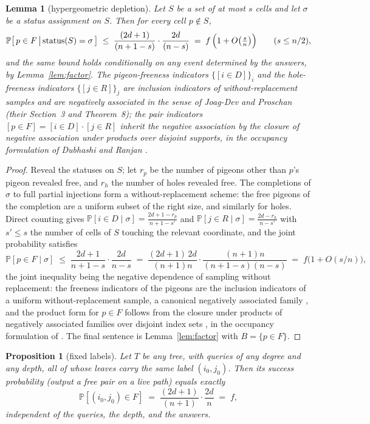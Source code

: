 \documentclass[11pt]{article}
\newtheorem{proposition}[theorem]{Proposition}
\newtheorem{lemma}[theorem]{Lemma}
\theoremstyle{definition}
\theoremstyle{remark}
\newcommand{\Prob}{\mathbb{P}}
\begin{document}
\begin{lemma}[hypergeometric depletion]\label{lem:depletion}
Let $S$ be a set of at most $s$ cells and let $\sigma$ be a status
assignment on $S$.  Then for every cell $p\notin S$,
\[
\Prob\bigl[\,p\in F \,\big|\, \mathrm{status}(S)=\sigma\,\bigr]
\;\le\;\frac{(2d+1)}{(n+1-s)}\cdot\frac{2d}{(n-s)}
\;=\;f\,\Bigl(1+O\bigl(\tfrac{s}{n}\bigr)\Bigr)
\qquad (s\le n/2),
\]
and the same bound holds conditionally on any event determined by the
answers, by Lemma~\ref{lem:factor}.  The pigeon-freeness indicators
$\{[i\in D]\}_i$ and the hole-freeness indicators $\{[j\in R]\}_j$ are
inclusion indicators of without-replacement samples and are negatively
associated in the sense of Joag-Dev and Proschan
\cite{JoagDevProschan83} (their Section~3 and Theorem~8); the pair
indicators $[p\in F]=[i\in D]\cdot[j\in R]$ inherit the negative
association by the closure of negative association under products over
disjoint supports, in the occupancy formulation of Dubhashi and Ranjan
\cite{DubhashiRanjan98}.
\end{lemma}

\begin{proof}
Reveal the statuses on $S$; let $r_p$ be the number of pigeons other
than $p$'s pigeon revealed free, and $r_h$ the number of holes revealed
free.  The completions of $\sigma$ to full partial injections form a
without-replacement scheme: the free pigeons of the completion are a
uniform subset of the right size, and similarly for holes.  Direct
counting gives
$\Prob[i\in D\mid\sigma]=\frac{2d+1-r_p}{n+1-s'}$ and
$\Prob[j\in R\mid\sigma]=\frac{2d-r_h}{n-s'}$ with $s'\le s$ the number
of cells of $S$ touching the relevant coordinate, and the joint
probability satisfies
\[
\Prob[p\in F\mid\sigma]
\;\le\;\frac{2d+1}{n+1-s}\cdot\frac{2d}{n-s}
\;=\;\frac{(2d+1)\,2d}{(n+1)n}
 \cdot\frac{(n+1)n}{(n+1-s)(n-s)}
\;=\;f\bigl(1+O(s/n)\bigr),
\]
the joint inequality being the negative dependence of sampling without
replacement: the freeness indicators of the pigeons are the inclusion
indicators of a uniform without-replacement sample, a canonical
negatively associated family \cite{JoagDevProschan83}, and the product
form for $p\in F$ follows from the closure under products of
negatively associated families over disjoint index sets
\cite{JoagDevProschan83}, in the occupancy formulation of
\cite{DubhashiRanjan98}.  The final sentence is
Lemma~\ref{lem:factor} with $B=\{p\in F\}$.
\end{proof}

\begin{proposition}[fixed labels]\label{prop:fixed}
Let $T$ be any tree, with queries of any degree and any depth, all of
whose leaves carry the same label $(i_0,j_0)$.  Then its success
probability (output a free pair on a live path) equals exactly
\[
\Prob[(i_0,j_0)\in F]\;=\;\frac{(2d+1)}{(n+1)}\cdot\frac{2d}{n}\;=\;f,
\]
independent of the queries, the depth, and the answers.
\end{proposition}
\end{document}
